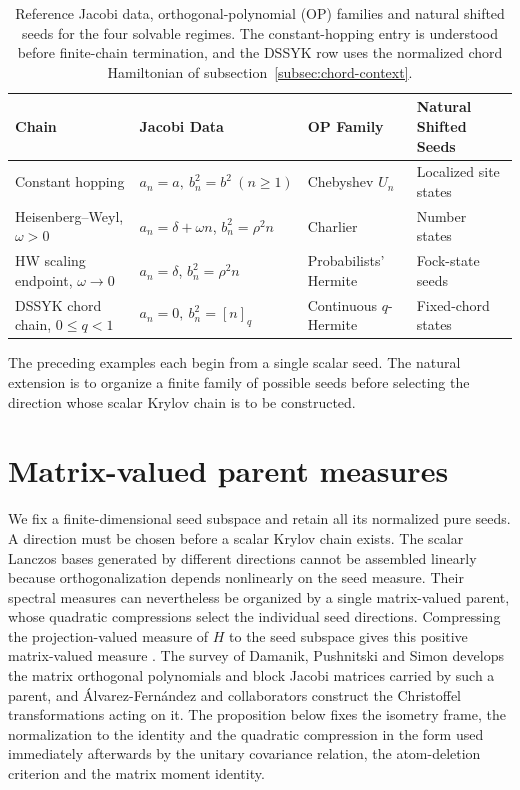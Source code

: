 \documentclass[a4paper,11pt]{article}
\theoremstyle{definition}
\theoremstyle{remark}
\begin{document}
\begin{table}[htbp]
\centering
\setlength{\tabcolsep}{3pt}
\begin{tabular}{@{}>{\raggedright\arraybackslash}p{}>{\raggedright\arraybackslash}p{}>{\raggedright\arraybackslash}p{}>{\raggedright\arraybackslash}p{}@{}}
\toprule
\textbf{Chain} & \textbf{Jacobi Data} & \textbf{OP Family} & \textbf{Natural Shifted Seeds} \\
\midrule
Constant hopping & $a_n=a,\ b_n^2=b^2\ (n\ge1)$ & Chebyshev $U_n$ & Localized site states \\
Heisenberg--Weyl, \(\omega>0\) & $a_n=\delta+\omega n$, $b_n^2=\rho^2n$ & Charlier & Number states \\
HW scaling endpoint, \(\omega\to0\) & $a_n=\delta$, $b_n^2=\rho^2n$ & Probabilists' Hermite & Fock-state seeds \\
DSSYK chord chain, $0\le q<1$ & $a_n=0,\ b_n^2=[n]_q$ & Continuous $q$-Hermite & Fixed-chord states \\
\bottomrule
\end{tabular}
\caption{Reference Jacobi data, orthogonal-polynomial (OP) families and natural shifted seeds for
the four solvable regimes.  The constant-hopping entry is understood before finite-chain
termination, and the DSSYK row uses the normalized chord Hamiltonian of
subsection~\ref{subsec:chord-context}.}
\label{tab:universality_classes}
\end{table}

The preceding examples each begin from a single scalar seed. The natural extension is to organize a finite family of possible seeds before selecting the direction whose scalar Krylov chain is to be constructed.

\section{Matrix-valued parent measures}
\label{sec:matrix}

We fix a finite-dimensional seed subspace and retain all its normalized pure seeds.  A direction
must be chosen before a scalar Krylov chain exists.  The scalar Lanczos bases generated by
different directions cannot be assembled linearly because orthogonalization depends nonlinearly
on the seed measure.  Their spectral measures can nevertheless be organized by a single
matrix-valued parent, whose quadratic compressions select the individual seed directions.
Compressing the projection-valued measure of $H$ to the seed subspace gives this positive
matrix-valued measure \cite{DamanikPushnitskiSimon2008,AlvarezFernandez2017}. The survey of Damanik, Pushnitski and Simon develops the matrix orthogonal polynomials and block Jacobi matrices carried by such a parent, and \'Alvarez-Fern\'andez and collaborators construct the Christoffel transformations acting on it. The proposition below fixes the isometry frame, the normalization to the identity and the quadratic compression in the form used immediately afterwards by the unitary covariance relation, the atom-deletion criterion and the matrix moment identity.
\end{document}
